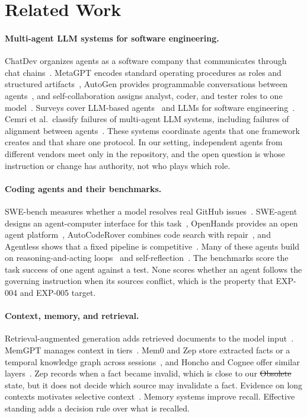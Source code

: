 \section{Related Work}
\label{sec:related}

\paragraph{Multi-agent LLM systems for software engineering.}
ChatDev organizes agents as a software company that communicates through chat chains~\cite{qian2024chatdev}. MetaGPT encodes standard operating procedures as roles and structured artifacts~\cite{hong2023metagpt}, AutoGen provides programmable conversations between agents~\cite{wu2023autogen}, and self-collaboration assigns analyst, coder, and tester roles to one model~\cite{dong2024selfcollab}. Surveys cover LLM-based agents~\cite{wang2024survey,he2025llmmas} and LLMs for software engineering~\cite{hou2024llm4se,fan2023llm4se}. Cemri et al.\ classify failures of multi-agent LLM systems, including failures of alignment between agents~\cite{cemri2025fail}. These systems coordinate agents that one framework creates and that share one protocol. In our setting, independent agents from different vendors meet only in the repository, and the open question is whose instruction or change has authority, not who plays which role.

\paragraph{Coding agents and their benchmarks.}
SWE-bench measures whether a model resolves real GitHub issues~\cite{jimenez2024swebench}. SWE-agent designs an agent-computer interface for this task~\cite{yang2024sweagent}, OpenHands provides an open agent platform~\cite{wang2025openhands}, AutoCodeRover combines code search with repair~\cite{zhang2024autocoderover}, and Agentless shows that a fixed pipeline is competitive~\cite{xia2024agentless}. Many of these agents build on reasoning-and-acting loops~\cite{yao2023react} and self-reflection~\cite{shinn2023reflexion}. The benchmarks score the task success of one agent against a test. None scores whether an agent follows the governing instruction when its sources conflict, which is the property that EXP-004 and EXP-005 target.

\paragraph{Context, memory, and retrieval.}
Retrieval-augmented generation adds retrieved documents to the model input~\cite{lewis2020rag}. MemGPT manages context in tiers~\cite{packer2023memgpt}. Mem0 and Zep store extracted facts or a temporal knowledge graph across sessions~\cite{chhikara2025mem0,rasmussen2025zep}, and Honcho and Cognee offer similar layers~\cite{honcho2026,cognee2026}. Zep records when a fact became invalid, which is close to our \st{Obsolete} state, but it does not decide which source may invalidate a fact. Evidence on long contexts motivates selective context~\cite{liu2024lost,hsieh2024ruler,bai2024longbench,shi2023distracted}. Memory systems improve recall. Effective standing adds a decision rule over what is recalled.


